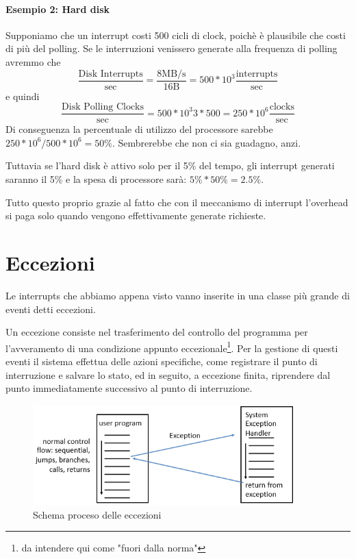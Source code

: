 \documentclass[class=book, crop=false, oneside]{standalone}
\begin{document}
\paragraph{Esempio 2: Hard disk} Supponiamo che un interrupt costi 500 cicli di clock, poichè è plausibile che costi di più del polling.
Se le interruzioni venissero generate alla frequenza di polling avremmo che \[\frac{\textrm{Disk Interrupts}}{\textrm{sec}}=\frac{8 \textrm{MB/s}}{16\textrm{B}}=500*10^{3}\frac{\textrm{interrupts}}{\textrm{sec}}\] e quindi \[\frac{\textrm{Disk Polling Clocks}}{\textrm{sec}}=500*10^3{3}*500=250*10^{6} \frac{\textrm{clocks}}{\textrm{sec}}\] Di conseguenza la percentuale di utilizzo del processore sarebbe \(250*10^{6}/500*10^{6}= 50\%\). Sembrerebbe che non ci sia guadagno, anzi.

Tuttavia se l’hard disk è attivo solo per il 5\% del tempo, gli interrupt generati saranno il 5\% e la spesa di processore sarà: \(5\% * 50\%=2.5\%\).

Tutto questo proprio grazie al fatto che con il meccanismo di interrupt l’overhead si paga solo quando vengono effettivamente generate richieste.

\section{Eccezioni}
Le interrupts che abbiamo appena visto vanno inserite in una classe più grande di eventi detti eccezioni.

Un eccezione consiste nel trasferimento del controllo del programma per l'avveramento di una condizione appunto eccezionale\footnote{da intendere qui come "fuori dalla norma"}.
Per la gestione di questi eventi il sistema effettua delle azioni specifiche, come registrare il punto di interruzione e salvare lo stato, ed in seguito, a eccezione finita, riprendere dal punto immediatamente successivo al punto di interruzione.

\begin{figure}[H]
	\centering
	\includegraphics[width=0.9\textwidth,keepaspectratio]{schema-eccezioni}
	\caption{Schema proceso delle eccezioni}
\end{figure}
\end{document}
